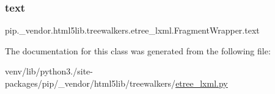 \subsubsection{\texorpdfstring{text}{text}}
{\footnotesize\ttfamily pip.\+\_\+vendor.\+html5lib.\+treewalkers.\+etree\+\_\+lxml.\+Fragment\+Wrapper.\+text}



The documentation for this class was generated from the following file\+:\begin{DoxyCompactItemize}
\item 
venv/lib/python3./site-\/packages/pip/\+\_\+vendor/html5lib/treewalkers/\hyperlink{treewalkers_2etree__lxml_8py}{etree\+\_\+lxml.\+py}\end{DoxyCompactItemize}
